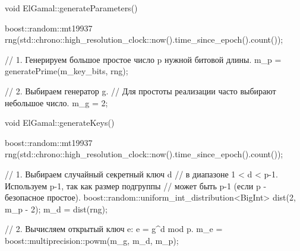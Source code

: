 \begin{nvimstyle}
void ElGamal::generateParameters()
{
	boost::random::mt19937 rng(std::chrono::high_resolution_clock::now().time_since_epoch().count());

	// 1. Генерируем большое простое число p нужной битовой длины.
	m_p = generatePrime(m_key_bits, rng);

	// 2. Выбираем генератор g.
	// Для простоты реализации часто выбирают небольшое число. 
	m_g = 2;
}
\end{nvimstyle}
\begin{nvimstyle}
void ElGamal::generateKeys()
{
	boost::random::mt19937 rng(std::chrono::high_resolution_clock::now().time_since_epoch().count());

	// 1. Выбираем случайный секретный ключ d 
	// в диапазоне 1 < d < p-1. Используем p-1, так как размер подгруппы
	// может быть p-1 (если p - безопасное простое).
	boost::random::uniform_int_distribution<BigInt> dist(2, m_p - 2);
	m_d = dist(rng);

	// 2. Вычисляем открытый ключ e: e = g^d mod p.
	m_e = boost::multiprecision::powm(m_g, m_d, m_p);
}
\end{nvimstyle}